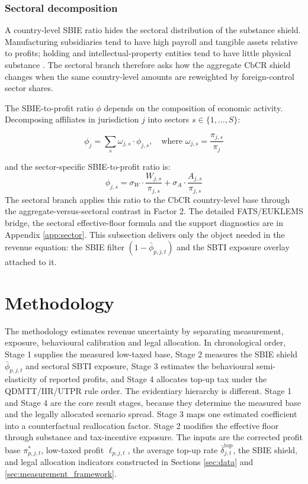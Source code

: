 \documentclass[11pt,a4paper]{article}
\begin{document}
\subsubsection{Sectoral decomposition}\label{sec:sbie_decomp}

A country-level SBIE ratio hides the sectoral distribution of the substance shield. Manufacturing subsidiaries tend to have high payroll and tangible assets relative to profits; holding and intellectual-property entities tend to have little physical substance \citep{devereux2023}. The sectoral branch therefore asks how the aggregate CbCR shield changes when the same country-level amounts are reweighted by foreign-control sector shares.

The SBIE-to-profit ratio $\phi$ depends on the composition of economic activity. Decomposing affiliates in jurisdiction $j$ into sectors $s \in \{1, \ldots, S\}$:

\begin{equation}\label{eq:rho_sectoral}
\phi_j = \sum_s \omega_{j,s} \cdot \phi_{j,s}, \quad \text{where } \omega_{j,s} = \frac{\pi_{j,s}}{\pi_j}
\end{equation}

and the sector-specific SBIE-to-profit ratio is:
\begin{equation}\label{eq:rho_sector}
\phi_{j,s} = \sigma_W \cdot \frac{W_{j,s}}{\pi_{j,s}} + \sigma_A \cdot \frac{A_{j,s}}{\pi_{j,s}}
\end{equation}
The sectoral branch applies this ratio to the CbCR country-level base through the aggregate-versus-sectoral contrast in Factor 2. The detailed FATS/EUKLEMS bridge, the sectoral effective-floor formula and the support diagnostics are in Appendix \ref{app:sector}. This subsection delivers only the object needed in the revenue equation: the SBIE filter $(1 - \bar{\phi}_{p,j,t})$ and the SBTI exposure overlay attached to it.

\newpage

\section{Methodology}\label{sec:methodology}

The methodology estimates revenue uncertainty by separating measurement, exposure, behavioural calibration and legal allocation. In chronological order, Stage 1 supplies the measured low-taxed base, Stage 2 measures the SBIE shield $\bar{\phi}_{p,j,t}$ and sectoral SBTI exposure, Stage 3 estimates the behavioural semi-elasticity of reported profits, and Stage 4 allocates top-up tax under the QDMTT/IIR/UTPR rule order. The evidentiary hierarchy is different. Stage 1 and Stage 4 are the core result stages, because they determine the measured base and the legally allocated scenario spread. Stage 3 maps one estimated coefficient into a counterfactual reallocation factor. Stage 2 modifies the effective floor through substance and tax-incentive exposure. The inputs are the corrected profit base $\pi^{*}_{p,j,t}$, low-taxed profit $\ell_{p,j,t}$, the average top-up rate $\bar{\delta}_{j,t}^{\text{top}}$, the SBIE shield, and legal allocation indicators constructed in Sections \ref{sec:data} and \ref{sec:measurement_framework}.
\end{document}
